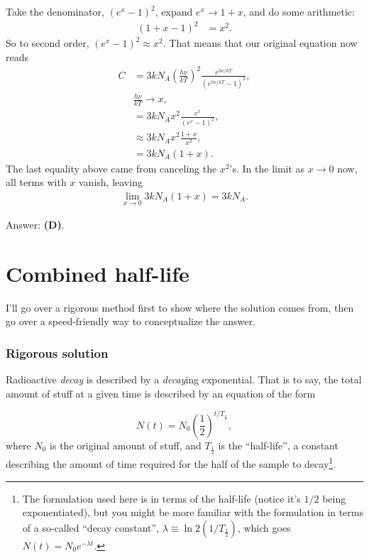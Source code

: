 \documentclass[11pt]{paper}
\newcommand{\answer}[1]{Answer: \textbf{(#1)}.}
\begin{document}
Take the denominator, $(e^x-1)^2$,  expand $e^x\rightarrow1+x$, and do some arithmetic:
\begin{align}
(1+x - 1)^2 &= x^2.
\end{align}
So to second order, $(e^x-1)^2 \approx x^2$.  That means that our original equation now reads
\begin{align}
C &= 3kN_A\left(\frac{h\nu}{kT}\right)^2\frac{e^{h\nu/kT}}{\left(e^{h\nu/kT}-1\right)^2},\\
&\frac{h\nu}{kT} \rightarrow x,\\
&= 3kN_Ax^2\frac{e^{x}}{\left(e^{x}-1\right)^2},\\
&\approx 3kN_Ax^2\frac{1+x}{x^2},\\
&= 3kN_A\left(1+x\right).
\end{align}
The last equality above came from canceling the $x^2$'s.  In the limit as $x\rightarrow0$ now, all terms with $x$ vanish, leaving
\begin{align}
\lim_{x\rightarrow0} 3kN_A\left(1+x\right) = 3kN_A.
\end{align}

\answer{D}

\section{Combined half-life}
I'll go over a rigorous method first to show where the solution comes from, then go over a speed-friendly way to conceptualize the answer.

\subsubsection*{Rigorous solution}
Radioactive \emph{decay} is described by a \emph{decay}ing exponential.  That is to say, the total amount of stuff at a given time is described by an equation of the form

\begin{equation}
N(t) = N_0 \left(\frac{1}{2}\right)^{t/T_{\frac{1}{2}}},
\end{equation}
where $N_0$ is the original amount of stuff, and $T_{\frac{1}{2}}$ is the ``half-life'', a constant describing the amount of time required for the half of the sample to decay\footnote{The formulation used here is in terms of the half-life (notice it's $1/2$ being exponentiated), but you might be more familiar with the formulation in terms of a so-called ``decay constant'', $\lambda \equiv \ln{2}\left(1/T_{\frac{1}{2}}\right)$, which goes $N(t) = N_0 e^{-\lambda t}$.}.
\end{document}

